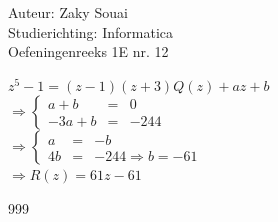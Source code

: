\documentclass[a4paper]{article}
\begin{document}
  
\noindent \large Auteur: Zaky Souai \\
\noindent \large Studierichting:  Informatica\\
\noindent \large Oefeningenreeks 1E nr. 12\\

\bigskip

\normalsize

$z^5-1 = (z-1)(z+3)Q(z)+az+b$\\

$\Rightarrow \left\{
    \begin{array}{lll} 
        a+b &=& 0 \\
        -3a+b &=& -244
    \end{array}
\right .$\\

$\Rightarrow \left\{
    \begin{array}{lll} 
        a &=& -b \\
        4b &=& -244 \Rightarrow b = -61
    \end{array}
\right .$\\

$\Rightarrow R(z) = 61z -61$


\begin{thebibliography}{999}
\end{thebibliography}
\end{document}
